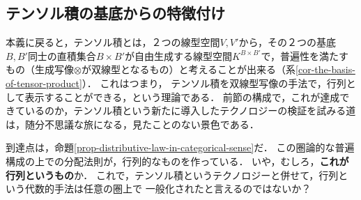 \documentclass[uplatex, dvipdfmx]{jsreport}
\begin{document}
\subsection{テンソル積の基底からの特徴付け}

\begin{tcolorbox}[colframe=ForestGreen, colback=ForestGreen!10!white, breakable ,colbacktitle=ForestGreen!40!white, coltitle=black,fonttitle=\bfseries\sffamily,
    title=行列の再定義・直和と直積が行列の全てである]
    本義に戻ると，テンソル積とは，２つの線型空間$V,V'$から，その２つの基底$B,B'$同士の直積集合$B\times B'$が自由生成する線型空間$K^{B\times B'}$で，普遍性を満たすもの（生成写像$\otimes$が双線型となるもの）と考えることが出来る（系\ref{cor-the-basis-of-tensor-product}）．
    これはつまり，
    テンソル積を双線型写像の手法で，行列として表示することができる，という理論である．
    前節の構成で，これが達成できているのか，テンソル積という新たに導入したテクノロジーの検証を試みる道は，随分不思議な旅になる，見たことのない景色である．
    
    到達点は，命題\ref{prop-distributive-law-in-categorical-sense}だ．
    この圏論的な普遍構成の上での分配法則が，行列的なものを作っている．
    いや，むしろ，\textbf{これが行列というもの}か．
    これで，テンソル積というテクノロジーと併せて，行列という代数的手法は任意の圏上で
    一般化されたと言えるのではないか？
\end{tcolorbox}
\end{document}

